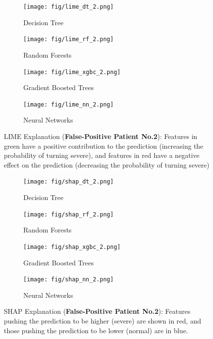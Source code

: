 \clearpage
\begin{figure}
\centering
\begin{subfigure}[b]{0.45\textwidth}
    \centering
    \texttt{[image: fig/lime\_dt\_2.png]}
    \caption{Decision Tree}
    \label{fig:lime_dt_2}
\end{subfigure}
\hfill
\begin{subfigure}[b]{0.45\textwidth}
    \centering
    \texttt{[image: fig/lime\_rf\_2.png]}
    \caption{Random Forests}
    \label{fig:lime_rf_2}
\end{subfigure}
\hfill
\begin{subfigure}[b]{0.45\textwidth}
    \centering
    \texttt{[image: fig/lime\_xgbc\_2.png]}
    \caption{Gradient Boosted Trees}
    \label{fig:lime_xgb_2}
\end{subfigure}
\hfill
\begin{subfigure}[b]{0.45\textwidth}
    \centering
    \texttt{[image: fig/lime\_nn\_2.png]}
    \caption{Neural Networks}
    \label{fig:lime_nn_2}
\end{subfigure}
\hfill
\caption{LIME Explanation (\textbf{False-Positive Patient No.2}): Features in green have a positive contribution to the prediction (increasing the probability of turning severe), and features in red have a negative effect on the prediction (decreasing the probability of turning severe)}
\label{fig:lime_2}
\end{figure}

\begin{figure}
\centering
\begin{subfigure}[b]{1.0\textwidth}
    \centering
    \texttt{[image: fig/shap\_dt\_2.png]}
    \caption{Decision Tree}
    \label{fig:shap_dt_2}
\end{subfigure}
\hfill
\begin{subfigure}[b]{1.0\textwidth}
    \centering
    \texttt{[image: fig/shap\_rf\_2.png]}
    \caption{Random Forests}
    \label{fig:shap_rf_2}
\end{subfigure}
\hfill
\begin{subfigure}[b]{1.0\textwidth}
    \centering
    \texttt{[image: fig/shap\_xgbc\_2.png]}
    \caption{Gradient Boosted Trees}
    \label{fig:shap_xgbc_2}
\end{subfigure}
\hfill
\begin{subfigure}[b]{1.0\textwidth}
    \centering
    \texttt{[image: fig/shap\_nn\_2.png]}
    \caption{Neural Networks}
    \label{fig:shap_nn_2}
\end{subfigure}
\hfill
\caption{SHAP Explanation (\textbf{False-Positive Patient No.2}): Features pushing the prediction to be higher (severe) are shown in red,  and those pushing the prediction to be lower (normal) are in blue.}
\label{fig:shap_2}
\end{figure}

